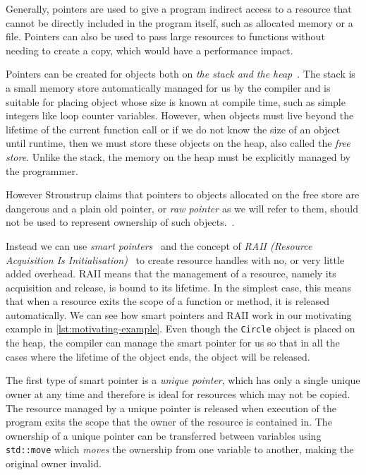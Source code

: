 \documentclass{mpaper}
\begin{document}
    Generally, pointers are used to give a program indirect access to a resource that cannot be directly included in the program itself, such as allocated memory or a file.
    Pointers can also be used to pass large resources to functions without needing to create a copy, which would have a performance impact. 
    
    Pointers can be created for objects both on \emph{the stack and the heap}~\cite{Stroustrup2000}. 
    The stack is a small memory store automatically managed for us by the compiler and is suitable for placing object whose size is known at compile time, such as simple integers like loop counter variables.
    However, when objects must live beyond the lifetime of the current function call or if we do not know the size of an object until runtime, then we must store these objects on the heap, also called the \emph{free store}. 
    Unlike the stack, the memory on the heap must be explicitly managed by the programmer.
    
    However Stroustrup claims that pointers to objects allocated on the free store are dangerous and a plain old pointer, or \emph{raw pointer} as we will refer to them, should not be used to represent ownership of such objects.~\cite{Stroustrup2018}.

    Instead we can use \emph{smart pointers}~\cite{Dimov2003} and the concept of \emph{RAII (Resource Acquisition Is Initialisation)}~\cite{Stroustrup2000} to create resource handles with no, or very little added overhead.
    RAII means that the management of a resource, namely its acquisition and release, is bound to its lifetime. 
    In the simplest case, this means that when a resource exits the scope of a function or method, it is released automatically.
    We can see how smart pointers and RAII work in our motivating example in  \autoref{lst:motivating-example}.
    Even though the \texttt{Circle} object is placed on the heap, the compiler can manage the smart pointer for us so that in all the cases where the lifetime of the object ends, the object will be released. 

    The first type of smart pointer is a \emph{unique pointer}, which has only a single unique owner at any time and therefore is ideal for resources which may not be copied.
    The resource managed by a unique pointer is released when execution of the program exits the scope that the owner of the resource is contained in.
    The ownership of a unique pointer can be transferred between variables using \texttt{std::move} which \emph{moves} the ownership from one variable to another, making the original owner invalid.
\end{document}
